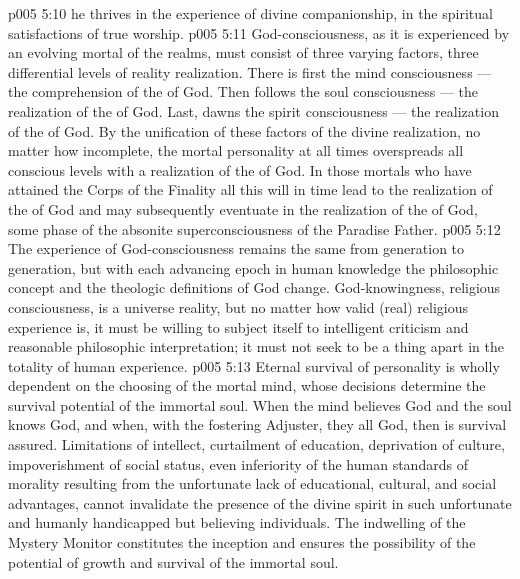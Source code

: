 \vs p005 5:10 \bibnobreakspace {} he thrives in the experience of divine companionship, in the spiritual satisfactions of true worship.
\vs p005 5:11 \pc God\hyp{}consciousness, as it is experienced by an evolving mortal of the realms, must consist of three varying factors, three differential levels of reality realization. There is first the mind consciousness --- the comprehension of the  of God. Then follows the soul consciousness --- the realization of the  of God. Last, dawns the spirit consciousness --- the realization of the  of God. By the unification of these factors of the divine realization, no matter how incomplete, the mortal personality at all times overspreads all conscious levels with a realization of the  of God. In those mortals who have attained the Corps of the Finality all this will in time lead to the realization of the  of God and may subsequently eventuate in the realization of the  of God, some phase of the absonite superconsciousness of the Paradise Father.
\vs p005 5:12 The experience of God\hyp{}consciousness remains the same from generation to generation, but with each advancing epoch in human knowledge the philosophic concept and the theologic definitions of God  change. God\hyp{}knowingness, religious consciousness, is a universe reality, but no matter how valid (real) religious experience is, it must be willing to subject itself to intelligent criticism and reasonable philosophic interpretation; it must not seek to be a thing apart in the totality of human experience.
\vs p005 5:13 \pc Eternal survival of personality is wholly dependent on the choosing of the mortal mind, whose decisions determine the survival potential of the immortal soul. When the mind believes God and the soul knows God, and when, with the fostering Adjuster, they all  God, then is survival assured. Limitations of intellect, curtailment of education, deprivation of culture, impoverishment of social status, even inferiority of the human standards of morality resulting from the unfortunate lack of educational, cultural, and social advantages, cannot invalidate the presence of the divine spirit in such unfortunate and humanly handicapped but believing individuals. The indwelling of the Mystery Monitor constitutes the inception and ensures the possibility of the potential of growth and survival of the immortal soul.
